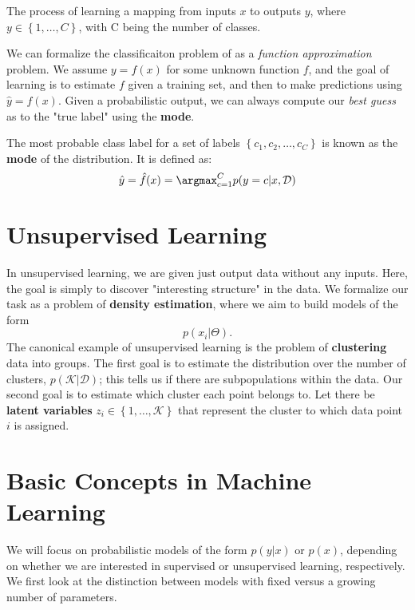 \begin{definition}[Classification]
	The process of learning a mapping from inputs \(x\) to outputs \(y\), where \(y \in \left\{ 1, \ldots , C \right\} \), with C being the number of classes.
\end{definition}

We can formalize the classificaiton problem of as a \emph{function approximation} problem. We assume \(y=f(x)\) for some unknown function \(f\), and the goal of learning is to estimate \(f\) given a training set, and then to make predictions using \(\hat{y}=f(x)\). Given a probabilistic output, we can always compute our \emph{best guess} as to the "true label" using the \textbf{mode}.
\begin{definition}[Mode]
	The most probable class label for a set of labels \(\left\{ c_1, c_2, \ldots , c_C \right\} \) is known as the \textbf{mode} of the distribution. It is defined as:
	\[
		\hat{y} = \hat{f}(x)=\argmax_{c=1}^C p(y=c | x, \mathcal{D} ) 
	\] 
\end{definition}

\section{Unsupervised Learning}
In unsupervised learning, we are given just output data without any inputs. Here, the goal is simply to discover "interesting structure" in the data. We formalize our task as a problem of \textbf{density estimation}, where we aim to build models of the form
\[
	p(x_i | \Theta).
\]
The canonical example of unsupervised learning is the problem of \textbf{clustering} data into groups. The first goal is to estimate the distribution over the number of clusters, \(p(\mathcal{K} |\mathcal{D} )\); this tells us if there are subpopulations within the data. Our second goal is to estimate which cluster each point belongs to. Let there be \textbf{latent variables} \(z_i \in \left\{ 1, \ldots , \mathcal{K} \right\} \) that represent the cluster to which data point \(i\) is assigned.

\section{Basic Concepts in Machine Learning}
We will focus on probabilistic models of the form \(p(y|x)\) or \(p(x)\), depending on whether we are interested in supervised or unsupervised learning, respectively. We first look at the distinction between models with fixed versus a growing number of parameters. 

